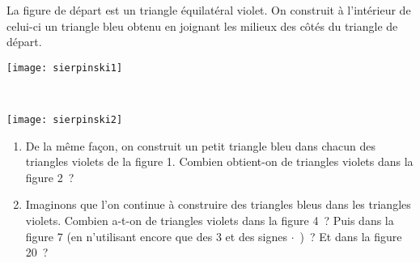 
\begin{activite}

\begin{partie}

 \begin{minipage}[c]{0.5\linewidth}
La figure de départ est un triangle équilatéral violet. On construit à l'intérieur de celui-ci un triangle bleu obtenu en joignant les milieux des côtés du triangle de départ.
 \end{minipage} \hfill%
 \begin{minipage}[c]{0.4\linewidth}
  \texttt{[image: sierpinski1]}
  \end{minipage} \\[1.5em]
 
 \begin{minipage}[c]{0.2\linewidth}
 \begin{center} \texttt{[image: sierpinski2]} \end{center}
 \end{minipage} \hfill%
 \begin{minipage}[c]{0.74\linewidth}
  \begin{enumerate}
   \item De la même façon, on construit un petit triangle bleu dans chacun des triangles violets de la figure 1. Combien obtient-on de triangles violets dans la figure 2 ?
   \item Imaginons que l'on continue à construire des triangles bleus dans les triangles violets. Combien a-t-on de triangles violets dans la figure 4 ? Puis dans la figure 7 (en n'utilisant encore que des 3 et des signes $\cdot$ ) ? Et dans la figure 20 ?
   \end{enumerate}
  \end{minipage} \\[1em]
  
\end{partie}



\end{activite}
